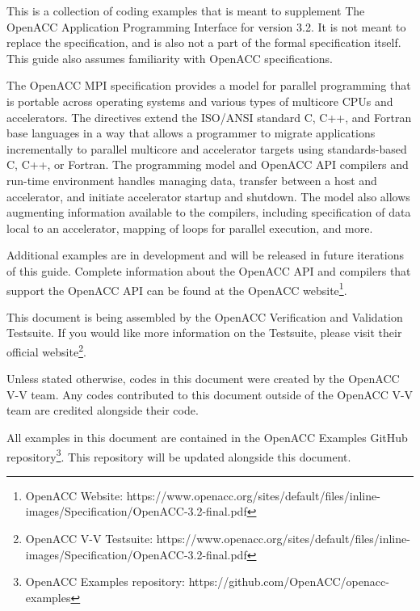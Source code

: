 This is a collection of coding examples that is meant to supplement The OpenACC Application Programming Interface for version 3.2. It is not meant to replace the specification, and is also not a part of the formal specification itself. This guide also assumes familiarity with OpenACC specifications. 

The OpenACC MPI specification provides a model for parallel programming that is portable across operating systems and various types of multicore CPUs and accelerators. The directives extend the ISO/ANSI standard C, C++, and Fortran base languages in a way that allows a programmer to migrate applications incrementally to parallel multicore and accelerator targets using standards-based C, C++, or Fortran. The programming model and OpenACC API compilers and run-time environment handles managing data, transfer between a host and accelerator, and initiate accelerator startup and shutdown. The model also allows augmenting information available to the compilers, including specification of data local to an accelerator, mapping of loops for parallel execution, and more.

Additional examples are in development and will be released in future iterations of this guide. Complete information about the OpenACC API and compilers that support the OpenACC API can be found at the OpenACC website\footnote{OpenACC Website: https://www.openacc.org/sites/default/files/inline-images/Specification/OpenACC-3.2-final.pdf}.

This document is being assembled by the OpenACC Verification and Validation Testsuite. If you would like more information on the Testsuite, please visit their official website\footnote{OpenACC V-V Testsuite: https://www.openacc.org/sites/default/files/inline-images/Specification/OpenACC-3.2-final.pdf}.

Unless stated otherwise, codes in this document were created by the OpenACC V-V team. Any codes contributed to this document outside of the OpenACC V-V team are credited alongside their code. 

All examples in this document are contained in the OpenACC Examples GitHub repository\footnote{OpenACC Examples repository: https://github.com/OpenACC/openacc-examples}. This repository will be updated alongside this document. 